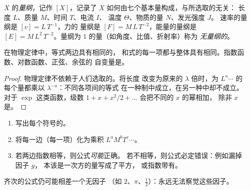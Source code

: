 \begin{definition}[量纲]\label{def:b1:units-dimensions:dimension}
 $X$ 的\emph{量纲}，记作 $[X]$，记录了 $X$
如何由七个基本量构成，与所选取的无关：
长度 $L$、质量 $M$、时间 $T$、电流 $I$、
温度 $\Theta$、物质的量 $N$、发光强度 $J$。
速率的量纲是 $[v] = L\,T^{-1}$，力的
量纲是 $[F] = M\,L\,T^{-2}$，能量的量纲是 $[E] = M\,L^2\,T^{-2}$。量纲为
$1$ 的量（如角度、比值、折射率）称为
\emph{无量纲的}。
\end{definition}

\begin{theorem}[量纲齐次性原理]\label{thm:b1:units-dimensions:homogeneity}
在物理定律中，等式两边具有相同的，
和式的每一项都与整体具有相同。指数函数、对数函数、正弦、余弦的
自变量是。
\end{theorem}

\begin{proof}
物理定律不依赖于人们选取的。将长度
改变为原来的 $\lambda$ 倍时，为
$L^a \cdots$ 的每个量都乘以 $\lambda^{-a}$：不同各项间的等式
在一种制中成立，在另一种中却不成立。
对于 $\exp$ 这类函数，级数
$1 + x + x^2/2 + \dots$ 会把不同的 $x$ 的幂相加，
除非 $x$ 是。
\end{proof}

\begin{method}[检验公式]\label{met:b1:units-dimensions:check}
\begin{enumerate}
  \item 写出每个符号的。
  \item 将每一边（每一项）化为乘积 $L^a M^b T^c \cdots$。
  \item 若两边指数相等，则公式\emph{可能}正确。
        若不相等，则公式必定错误：例如漏掉因子 $g$，
        本该是一次方的量写成了平方，
        或指数带有。
\end{enumerate}
齐次的公式仍可能相差一个无因子
（如 $2$、$\pi$、$\tfrac12$）：永远无法察觉这些因子。
\end{method}


